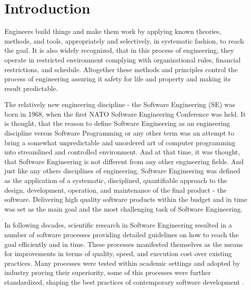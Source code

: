 \chapter{Introduction}
Engineers build things and make them work by applying known theories, methods, 
and tools, appropriately and selectively, in systematic fashion, to reach the goal. 
It is also widely recognized, that in this process of engineering, they operate 
in restricted environment complying with organizational rules, financial restrictions, 
and schedule. Altogether these methods and principles control the process of engineering 
assuring it safety for life and property and making its result predictable.

The relatively new engineering discipline - the Software Engineering (SE) was born in 1968, 
when the first NATO Software Engineering Conference was held. It is thought, that the reason
to define Software Engineering as an engineering discipline versus Software Programming or any other 
term was an attempt to bring a somewhat unpredictable and unordered art of computer programming 
into streamlined and controlled environment.
And at that time, it was thought, that Software Engineering is not different 
from any other engineering fields. And just like any others disciplines of engineering, 
Software Engineering was defined as the application of a systematic, disciplined, quantifiable 
approach to the design, development, operation, and maintenance of the final product - the software.
Delivering high quality software products within the budget and in time was set as the main goal 
and the most challenging task of Software Engineering.

In following decades, scientific research in Software Engineering resulted in a number of software 
processes providing detailed guidelines on how to reach the goal efficiently and in time. 
These processes manifested themselves as the means for improvements in terms of quality, 
speed, and execution cost over existing practices. Many processes were tested within academic 
settings and adopted by industry proving their superiority, some of this processes were 
further standardized, shaping the best practices of contemporary software development \cite{citeulike:9962021}. 

